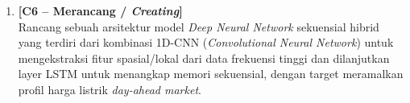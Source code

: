 \documentclass[11pt,a4paper]{article}
\begin{document}
\begin{enumerate}[leftmargin=1.8em, label=\textbf{Soal \arabic*.}]
    \item \textbf{[C6 -- Merancang / \textit{Creating}]} \\
    Rancang sebuah arsitektur model \textit{Deep Neural Network} sekuensial hibrid yang terdiri dari kombinasi 1D-CNN (\textit{Convolutional Neural Network}) untuk mengekstraksi fitur spasial/lokal dari data frekuensi tinggi dan dilanjutkan layer LSTM untuk menangkap memori sekuensial, dengan target meramalkan profil harga listrik \textit{day-ahead market}.
    \vspace{4.5cm}

\end{enumerate}
\end{document}
